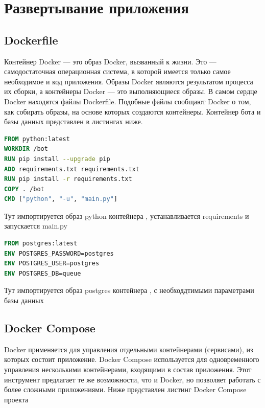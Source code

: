 \graphicspath{{./img/}} %

\chapter{Развертывание приложения}
\section{Dockerfile}
Контейнер Docker — это образ Docker, вызванный к жизни.
Это — самодостаточная операционная система, в которой имеется только самое необходимое и код приложения.
Образы Docker являются результатом процесса их сборки, а контейнеры Docker — это выполняющиеся образы.
В самом сердце Docker находятся файлы Dockerfile.
Подобные файлы сообщают Docker о том, как собирать образы, на основе которых создаются контейнеры.
Контейнер бота и базы данных представлен в листингах ниже. \par

\begin{lstlisting}[language=Dockerfile
, caption=\leftline{Dockerfile бота}
, label=lst:DF:bot]
FROM python:latest
WORKDIR /bot
RUN pip install --upgrade pip
ADD requirements.txt requirements.txt
RUN pip install -r requirements.txt
COPY . /bot
CMD ["python", "-u", "main.py"]
\end{lstlisting}

Тут импортируется образ python контейнера , устанавливается requirements и запускается main.py \par

\begin{lstlisting}[language=Dockerfile
, caption=\leftline{Dockerfile базы данных}
, label=lst:DF:db]
FROM postgres:latest
ENV POSTGRES_PASSWORD=postgres
ENV POSTGRES_USER=postgres
ENV POSTGRES_DB=queue
\end{lstlisting}

Тут импортируется образ postgres контейнера , с необходдтимыми параметрами базы данных \par


\section{Docker Compose}
Docker применяется для управления отдельными контейнерами (сервисами), из которых состоит приложение.
Docker Compose используется для одновременного управления несколькими контейнерами, входящими в состав приложения.
Этот инструмент предлагает те же возможности, что и Docker, но позволяет работать с более сложными приложениями.
Ниже представлен листинг Docker Compose проекта \par


